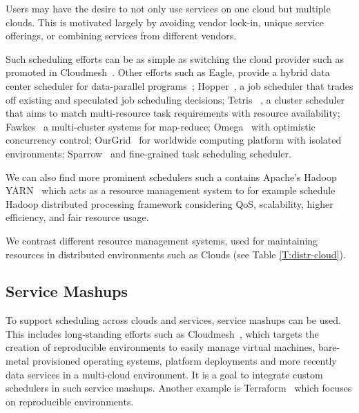 \documentclass[final,5p,times,twocolumn]{elsarticle}
\begin{document}
Users may have the desire to not only use services on one cloud but multiple clouds. This is motivated largely by avoiding vendor lock-in, unique service offerings, or combining services from different vendors.

Such scheduling efforts can be as simple as switching the cloud provider such as promoted in Cloudmesh~\cite{von2014accessing}. Other efforts such as Eagle, provide a hybrid data center scheduler for data-parallel programs~\cite{delgado2016job}; Hopper~\cite{ren2015hopper}, a job scheduler that trades off existing and speculated job scheduling decisions; Tetris ~\cite{grandl2015multi}, a cluster scheduler that aims to match multi-resource task requirements with resource availability; Fawkes~\cite{ghit2014balanced} a multi-cluster systems for map-reduce; Omega~\cite{schwarzkopf2013omega} with optimistic concurrency control; OurGrid~\cite{andrade2003ourgrid,cirne2006labs} for worldwide computing platform with isolated environments; Sparrow~\cite{ousterhout2013sparrow} and fine-grained task scheduling scheduler.
 
We can also find more prominent schedulers such a contains Apache's Hadoop YARN~\cite{vavilapalli2013apache} which acts as a resource management system to for example schedule Hadoop distributed processing framework considering QoS, scalability, higher efficiency, and fair resource usage.

We contrast different resource management systems, used for maintaining resources in distributed environments such as Clouds (see Table \ref{T:distr-cloud}).

%


\subsection{Service Mashups} 
\label{sec:mesh}

To support scheduling across clouds and services, service mashups can be used. This includes long-standing efforts such as Cloudmesh~\cite{von2014accessing}, which targets the creation of reproducible environments to easily manage virtual machines, bare-metal provisioned operating systems, platform deployments and more recently data services in a multi-cloud environment. It is a goal to integrate custom schedulers in such service mashups. Another example is Terraform~\cite{www-terraform} which focuses on reproducible environments.




\end{document}
